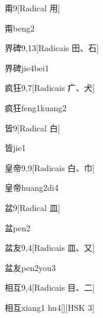 \begin{entry}{甭}{9}[Radical ⽤]
  \begin{phonetics}{甭}{beng2}
  \end{phonetics}
\end{entry}

\begin{entry}{界碑}{9,13}[Radicais ⽥、⽯]
  \begin{phonetics}{界碑}{jie4bei1}
  \end{phonetics}
\end{entry}

\begin{entry}{疯狂}{9,7}[Radicais ⽧、⽝]
  \begin{phonetics}{疯狂}{feng1kuang2}
  \end{phonetics}
\end{entry}

\begin{entry}{皆}{9}[Radical ⽩]
  \begin{phonetics}{皆}{jie1}
  \end{phonetics}
\end{entry}

\begin{entry}{皇帝}{9,9}[Radicais ⽩、⼱]
  \begin{phonetics}{皇帝}{huang2di4}
  \end{phonetics}
\end{entry}

\begin{entry}{盆}{9}[Radical ⽫]
  \begin{phonetics}{盆}{pen2}
  \end{phonetics}
\end{entry}

\begin{entry}{盆友}{9,4}[Radicais ⽫、⼜]
  \begin{phonetics}{盆友}{pen2you3}
  \end{phonetics}
\end{entry}

\begin{entry}{相互}{9,4}[Radicais ⽬、⼆]
  \begin{phonetics}{相互}{xiang1 hu4}[][HSK 3]
  \end{phonetics}
\end{entry}

